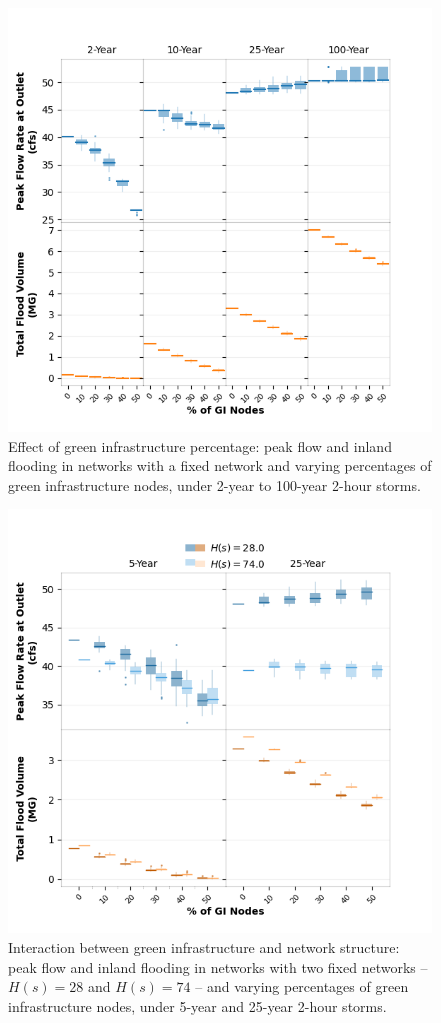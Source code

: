 \documentclass[draft]{agujournal2019}
\begin{document}
 \begin{figure}
 \noindent\includegraphics[width=\textwidth]{GI_number.png}
\caption{Effect of green infrastructure percentage: peak flow and inland flooding in networks with a fixed network and varying percentages of green infrastructure nodes, under 2-year to 100-year 2-hour storms. }
\label{fig:GI_number}
\end{figure}

 \begin{figure}
 \noindent\includegraphics[width=\textwidth]{GI_network_interaction.png}
\caption{Interaction between green infrastructure and network structure: peak flow and inland flooding in networks with two fixed networks -- $H(s) = 28$ and $H(s) = 74$ -- and varying percentages of green infrastructure nodes, under 5-year and 25-year 2-hour storms.}
\label{fig:interaction}
\end{figure}
\end{document}
